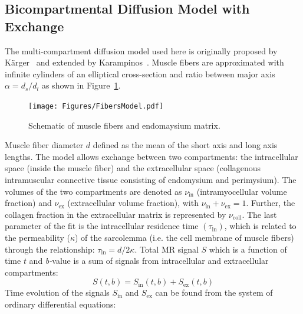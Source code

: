 \subsection{Bicompartmental Diffusion Model with Exchange}
\label{subsec: bicompart}
The multi-compartment diffusion model used here is originally proposed by K\"arger~\cite{KARGER19881} and extended by Karampinos~\cite{RND12}. 
Muscle fibers are approximated with infinite cylinders of an elliptical cross-section and ratio between major axis $\alpha = d_s/d_l$ as shown in Figure~\ref{fig: KargerModel}. 
\begin{figure}[!htb]
\vspace{+0.2cm}
\centering
\texttt{[image: Figures/FibersModel.pdf]}
\caption[Schematic of muscle fibers and endomaysium matrix]{Schematic of muscle fibers and endomaysium matrix.}
\label{fig: KargerModel}
\end{figure}
Muscle fiber diameter $d$ defined as the mean of the short axis and long axis lengths.
The model allows exchange between two compartments: the intracellular space (inside the muscle fiber) and the extracellular space (collagenous intramuscular connective tissue consisting of endomysium and perimysium).
The volumes of the two compartments are denoted as $\nu_{\mathrm{in}}$ (intramyocellular volume fraction) and $\nu_{\mathrm{ex}}$ (extracellular volume fraction), with $\nu_{\mathrm{in}} + \nu_{\mathrm{ex}} = 1$. 
Further, the collagen fraction in the extracellular matrix is represented by $\nu_{\mathrm{coll}}$. 
The last parameter of the fit is the intracellular residence time $(\tau_{\mathrm{in}})$, which is related to the permeability ($\kappa$) of the sarcolemma (i.e. the cell membrane of muscle fibers) through the relationship: $\tau_{\mathrm{in}} = d/2\kappa$. 
Total MR signal $S$ which is a function of time $t$ and \mbox{\textit{b-}value} is a sum of signals from intracellular and extracellular compartments:
\begin{equation}\label{eq: Karger Signal}
S(t,b) = S_{\mathrm{in}}(t,b)+S_{\mathrm{ex}}(t,b)
\end{equation}
Time evolution of the signals $S_\mathrm{in}$ and $S_\mathrm{ex}$ can be found from the system of ordinary differential equations:
